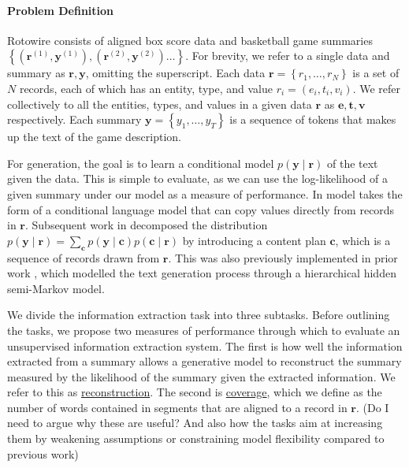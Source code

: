 \documentclass[11pt]{article}
\newcommand\set[1]{\left\{#1\right\}}
\newcommand{\bc}{\mathbf{c}}
\newcommand{\be}{\mathbf{e}}
\newcommand{\br}{\mathbf{r}}
\newcommand{\bt}{\mathbf{t}}
\newcommand{\bv}{\mathbf{v}}
\newcommand{\by}{\mathbf{y}}
\begin{document}
\paragraph{Problem Definition}
\begin{comment}
\item Define notation
\item Define generation, mention sam and puduppully work.
\item Define extraction and its subtasks, mention regina and percy's work.
\item TODO: maybe combine align and values? Although I prefer to keep them separate
since values will probably turn into fill in the away team's values given home team's
\end{comment}
Rotowire consists of aligned box score data and basketball game summaries
$\set{(\br^{(1)}, \by^{(1)}),(\br^{(2)},\by^{(2)})\ldots}$.
For brevity, we refer to a single data and summary as $\br,\by$, omitting the superscript.
Each data $\br = \set{r_1,\ldots,r_N}$ is a set of $N$ records, each of which has
an entity, type, and value $r_i = (e_i, t_i, v_i)$.
We refer collectively to all the entities, types, and values in a given data $\br$ as
$\be,\bt,\bv$ respectively.
Each summary $\by = \set{y_1,\ldots,y_T}$ is a sequence of tokens that makes up the
text of the game description.

For generation, the goal is to learn a conditional model $p(\by\mid\br)$ of the text given the data.
This is simple to evaluate, as we can use the log-likelihood of a given summary under our model
as a measure of performance.
In \citet{wiseman2017d2t} model takes the form of a conditional language model
that can copy values directly from records in $\br$.
Subsequent work in \citet{puduppully2018contentselection} decomposed the distribution 
$p(\by\mid\br) = \sum_{\bc}p(\by\mid\bc)p(\bc\mid\br)$
by introducing a content plan $\bc$, which is a sequence of records drawn from $\br$.
This was also previously implemented in prior work \citep{liang2009semalign},
which modelled the text generation process through a hierarchical hidden semi-Markov model.

We divide the information extraction task into three subtasks.
Before outlining the tasks, we propose two measures of performance through which
to evaluate an unsupervised information extraction system.
The first is how well the information extracted from a summary allows a 
generative model to reconstruct the summary measured by the likelihood
of the summary given the extracted information.
We refer to this as \underline{reconstruction}.
The second is \underline{coverage}, 
which we define as the number of words contained in segments
that are aligned to a record in $\br$.
(Do I need to argue why these are useful?
And also how the tasks aim at increasing them by weakening assumptions
or constraining model flexibility compared to previous work)
\end{document}
